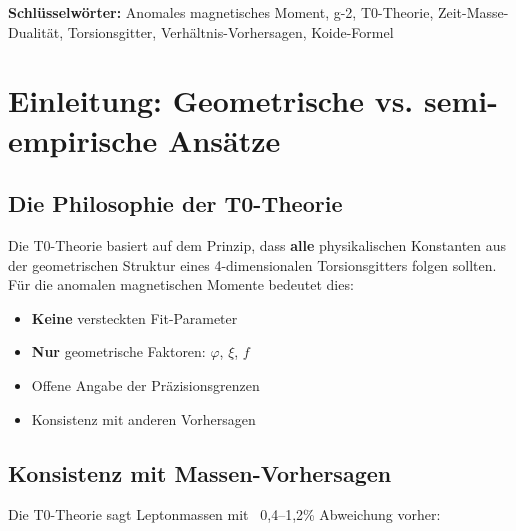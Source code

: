 	\textbf{Schlüsselwörter:} Anomales magnetisches Moment, g-2, T0-Theorie, Zeit-Masse-Dualität, Torsionsgitter, Verhältnis-Vorhersagen, Koide-Formel
	
	
	\section{Einleitung: Geometrische vs. semi-empirische Ansätze}
	
	\subsection{Die Philosophie der T0-Theorie}
	
	Die T0-Theorie basiert auf dem Prinzip, dass \textbf{alle} physikalischen Konstanten aus der geometrischen Struktur eines 4-dimensionalen Torsionsgitters folgen sollten. Für die anomalen magnetischen Momente bedeutet dies:
	
	\begin{itemize}
		\item \textbf{Keine} versteckten Fit-Parameter
		\item \textbf{Nur} geometrische Faktoren: $\varphi$, $\xi$, $f$
		\item Offene Angabe der Präzisionsgrenzen
		\item Konsistenz mit anderen Vorhersagen
	\end{itemize}
	
	\subsection{Konsistenz mit Massen-Vorhersagen}
	
	Die T0-Theorie sagt Leptonmassen mit ~0{,}4--1{,}2\% Abweichung vorher:
	
	\begin{table}[h]
		\centering
		\caption{Leptonmassen in T0}
	\end{table}
	
